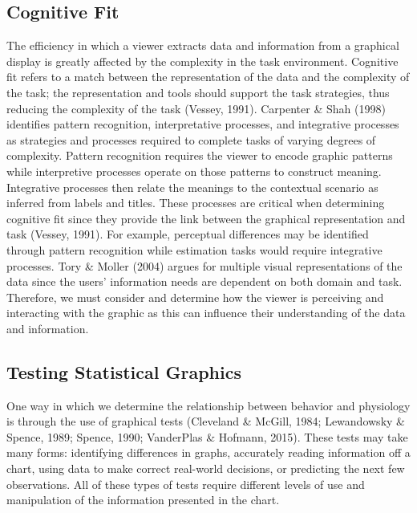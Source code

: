 \documentclass[print]{nuthesis}
\begin{document}
\hypertarget{cognitive-fit}{%
\subsection{Cognitive Fit}\label{cognitive-fit}}

The efficiency in which a viewer extracts data and information from a graphical display is greatly affected by the complexity in the task environment.
Cognitive fit refers to a match between the representation of the data and the complexity of the task; the representation and tools should support the task strategies, thus reducing the complexity of the task (Vessey, 1991).
Carpenter \& Shah (1998) identifies pattern recognition, interpretative processes, and integrative processes as strategies and processes required to complete tasks of varying degrees of complexity.
Pattern recognition requires the viewer to encode graphic patterns while interpretive processes operate on those patterns to construct meaning.
Integrative processes then relate the meanings to the contextual scenario as inferred from labels and titles.
These processes are critical when determining cognitive fit since they provide the link between the graphical representation and task (Vessey, 1991).
For example, perceptual differences may be identified through pattern recognition while estimation tasks would require integrative processes.
Tory \& Moller (2004) argues for multiple visual representations of the data since the users' information needs are dependent on both domain and task.
Therefore, we must consider and determine how the viewer is perceiving and interacting with the graphic as this can influence their understanding of the data and information.

\hypertarget{testing-statistical-graphics}{%
\subsection{Testing Statistical Graphics}\label{testing-statistical-graphics}}

One way in which we determine the relationship between behavior and physiology is through the use of graphical tests (Cleveland \& McGill, 1984; Lewandowsky \& Spence, 1989; Spence, 1990; VanderPlas \& Hofmann, 2015).
These tests may take many forms: identifying differences in graphs, accurately reading information off a chart, using data to make correct real-world decisions, or predicting the next few observations.
All of these types of tests require different levels of use and manipulation of the information presented in the chart.
\end{document}
